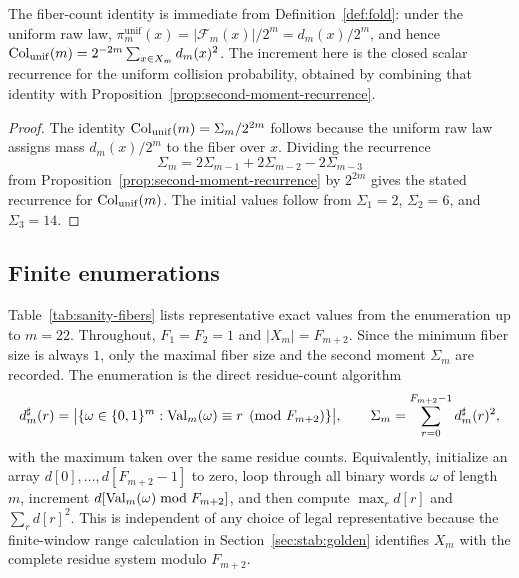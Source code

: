 \begin{remark}
The fiber-count identity is immediate from Definition~\ref{def:fold}: under
the uniform raw law,
$\pi_m^{\mathrm{unif}}(x)=|\mathcal F_m(x)|/2^m=d_m(x)/2^m$, and hence
$\mathrm{Col}_{\mathrm{unif}}(m)=2^{-2m}\sum_{x\in X_m}d_m(x)^2$. The increment here
is the closed scalar recurrence for the uniform collision probability,
obtained by combining that identity with
Proposition~\ref{prop:second-moment-recurrence}.
\end{remark}

\begin{proof}
The identity $\mathrm{Col}_{\mathrm{unif}}(m)=\Sigma_m/2^{2m}$ follows because the
uniform raw law assigns mass $d_m(x)/2^m$ to the fiber over $x$. Dividing the
recurrence
\[
\Sigma_m=2\Sigma_{m-1}+2\Sigma_{m-2}-2\Sigma_{m-3}
\]
from Proposition~\ref{prop:second-moment-recurrence} by $2^{2m}$ gives the stated
recurrence for $\mathrm{Col}_{\mathrm{unif}}(m)$. The initial values follow from
$\Sigma_1=2$, $\Sigma_2=6$, and $\Sigma_3=14$.
\end{proof}

\subsection{Finite enumerations}\label{sec:fiber-enumerations}

Table~\ref{tab:sanity-fibers} lists representative exact values from the enumeration up to $m=22$. Throughout, $F_1=F_2=1$ and $|X_m|=F_{m+2}$. Since the minimum fiber size is always $1$, only the maximal fiber size and the second moment $\Sigma_m$ are recorded. The enumeration is the direct residue-count algorithm
\[
d_m^\sharp(r)=
\bigl|\{\omega\in\{0,1\}^m:\mathrm{Val}_m(\omega)\equiv r\pmod {F_{m+2}}\}\bigr|,
\qquad
\Sigma_m=\sum_{r=0}^{F_{m+2}-1}d_m^\sharp(r)^2,
\]
with the maximum taken over the same residue counts. Equivalently, initialize
an array $d[0],\ldots,d[F_{m+2}-1]$ to zero, loop through all binary words
$\omega$ of length $m$, increment
$d[\mathrm{Val}_m(\omega)\bmod F_{m+2}]$, and then compute $\max_r d[r]$ and
$\sum_r d[r]^2$. This is independent of any choice of legal representative
because the finite-window range calculation in Section~\ref{sec:stab:golden}
identifies $X_m$ with the
complete residue system modulo $F_{m+2}$.

